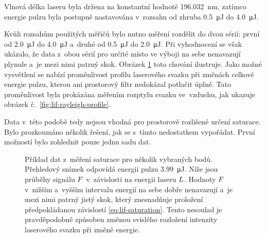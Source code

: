 Vlnová délka laseru byla držena na konstantní
hodnotě \SI{196.032}{\nano\metre},
zatímco energie pulzu byla postupně nastavována v~rozsahu
od zhruba \SI{0.5}{\micro\joule} do \SI{4.0}{\micro\joule}.

Kvůli rozsahům použitých měřičů bylo nutno měření rozdělit do dvou sérií:
první od \SI{2.0}{\micro\joule} do \SI{4.0}{\micro\joule}
a~druhé od \SI{0.5}{\micro\joule} do \SI{2.0}{\micro\joule}.
Při vyhodnocení se však ukázalo, že data z~obou sérií pro určité místo
ve výboji na sebe nenavazují plynule a~je mezi nimi patrný skok.
Obrázek \ref{fig:lif-saturation-full-example} toto chování ilustruje.
Jako možné vysvětlení se nabízí proměnlivost profilu laserového svazku
při změnách celkové energie pulzu, kterou ani prostorový filtr
nedokázal potlačit úplně.
Tato proměnlivost byla prokázána měřením rozptylu svazku ve~vzduchu,
jak ukazuje obrázek č.~\ref{fig:lif-rayleigh-profile}.

Data v~této podobě tedy nejsou vhodná pro prostorově rozlišené
určení saturace.
Bylo prozkoumáno několik řešení, jak se s~tímto nedostatkem vypořádat.
První možností bylo zohlednit pouze jednu sadu dat.

\begin{figure}
	\centering
	
	
	
	\caption{Příklad dat z~měření saturace pro několik vybraných bodů.
		Přehledový snímek odpovídá energii pulzu \SI{3.99}{\micro\joule}.
		Níže jsou průběhy signálu $F$ v~závislosti na energii
		laseru $L$.
		Hodnoty $F$ v~nižším a~vyšším intervalu energií na sebe
		dobře nenavazují a~je mezi nimi patrný jistý skok,
		který znesnadňuje proložení předpokládanou
		závislostí \eqref{eq:lif-saturation}.
		Tento nesoulad je pravděpodobně způsoben změnou svislého
		rozložení intenzity laserového svazku při změně energie.}
	\label{fig:lif-saturation-full-example}
\end{figure}
